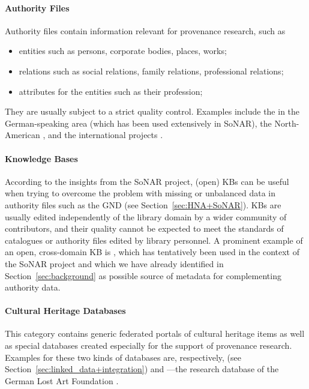 \paragraph{Authority Files}
%
Authority files
contain information relevant for provenance research, such as
%
\begin{itemize}
  \item
    entities such as persons, corporate bodies, places, works;
  \item
    relations such as social relations, family relations, professional relations;
  \item
    attributes for the entities such as their profession;
\end{itemize}
%
They are usually subject to a strict quality control.
Examples include the  \autocite{GND} in the German-speaking area (which has been used extensively in \gls{SoNAR}),
the North-American  \autocite{LCNAF},
and the international projects  \autocite{ISNI,VIAF}.

\paragraph{Knowledge Bases}

According to the insights from the \gls{SoNAR} project,
(open) \glspl{KB} can be useful when trying to overcome the problem with missing or unbalanced data
in authority files such as the \gls{GND} (see Section~\ref{sec:HNA+SoNAR}).
\Glspl{KB} are usually edited independently of the library domain by a wider community of contributors,
and their quality cannot be expected to meet the standards of catalogues or authority files edited by library personnel.
A prominent example of an open, cross-domain \gls{KB} is  \autocite{Wikidata},
which has tentatively been used in the context of the \gls{SoNAR} project
and which we have already identified in Section~\ref{sec:background} as possible source of metadata
for complementing authority data.

\paragraph{Cultural Heritage Databases}

This category contains generic federated portals of cultural heritage items
as well as special databases created especially for the support of provenance research.
Examples for these two kinds of databases are, respectively,  \autocite{Europeana} (see Section~\ref{sec:linked_data+integration})
and ---the research database of the German Lost Art Foundation \autocite{Proveana}.

